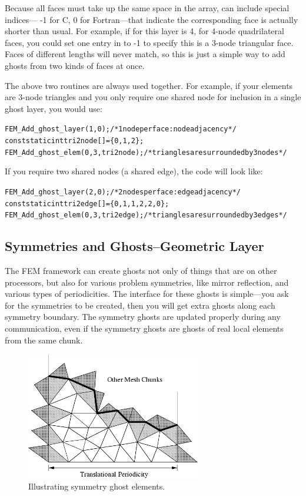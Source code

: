 \begin{itemize}
Because all faces must take up the same space in the array,
 can include special indices--- -1 for C, 0 for Fortran---that indicate the
corresponding face is actually shorter than usual.  For example, if  for this layer
is 4, for 4-node quadrilateral faces, you could set one entry in  to -1 to specify
this is a 3-node triangular face.  Faces of different lengths will never match, so this is just
a simple way to add ghosts from two kinds of faces at once.

\end{itemize}

The above two routines are always used together. For example, if your elements are 3-node triangles and you only require one shared node for inclusion in a single ghost layer, you would use:
\begin{alltt}
   FEM\_Add\_ghost\_layer(1,0); /* 1 node per face: node adjacency */
   const static int tri2node[]=\{0,1,2\};
   FEM\_Add\_ghost\_elem(0,3,tri2node); /* triangles are surrounded by 3 nodes */
\end{alltt}

If you require two shared nodes (a shared edge), the code will look like:
\begin{alltt}    
   FEM\_Add\_ghost\_layer(2,0); /* 2 nodes per face: edge adjacency */
   const static int tri2edge[]=\{0,1,  1,2,  2,0\};
   FEM\_Add\_ghost\_elem(0,3,tri2edge); /*triangles are surrounded by 3 edges */
\end{alltt}


\subsection{Symmetries and Ghosts--Geometric Layer}

The FEM framework can create ghosts not only of things that are on other 
processors, but also for various problem symmetries, like mirror reflection,
and various types of periodicities.  The interface for these ghosts is 
simple---you ask for the symmetries to be created, then you will get 
extra ghosts along each symmetry boundary.  The symmetry ghosts are
updated properly during any communication, even if the symmetry ghosts
are ghosts of real local elements from the same chunk.


\begin{figure}[h]
\begin{center}
\includegraphics[width=3in]{fig/sym_ghost}
\end{center}
\caption{Illustrating symmetry ghost elements.}
\label{fig:symghost}
\end{figure}

